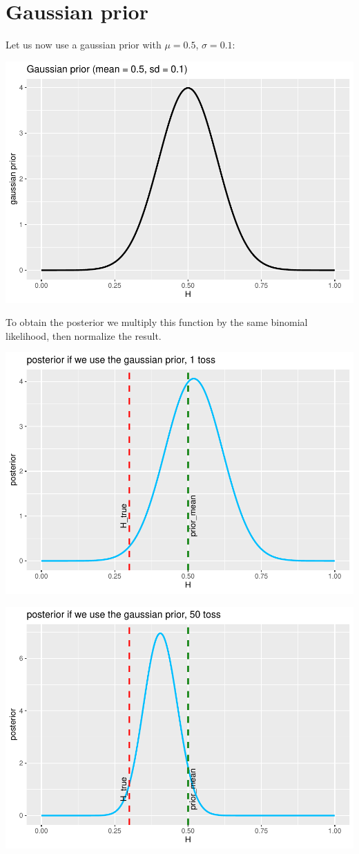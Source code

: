 \documentclass[
]{article}
\begin{document}
\hypertarget{gaussian-prior}{%
\section{Gaussian prior}\label{gaussian-prior}}

Let us now use a gaussian prior with \(\mu = 0.5\), \(\sigma = 0.1\):

\begin{center}\includegraphics[width=0.75\linewidth]{astrostat-1_files/figure-latex/unnamed-chunk-9-1} \end{center}

To obtain the posterior we multiply this function by the same binomial
likelihood, then normalize the result.

\begin{center}\includegraphics[width=0.75\linewidth]{astrostat-1_files/figure-latex/unnamed-chunk-11-1} \end{center}

\begin{center}\includegraphics[width=0.75\linewidth]{astrostat-1_files/figure-latex/unnamed-chunk-12-1} \end{center}
\end{document}

